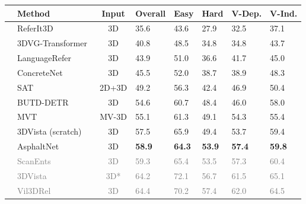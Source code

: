 \documentclass[10pt,twocolumn,letterpaper]{article}
\begin{document}
\begin{table}[t]
\centering
  \tabcolsep=0.26cm
\begin{tabular}{|c|l|c|x{1.2cm}|x{1.3cm} x{1.1cm} x{1.1cm} x{1.3cm}|}
 & Method & Input &  \textbf{Overall} & Easy & Hard & V-Dep. & V-Ind. \\
\hline
{} & ReferIt3D~\cite{achlioptas2020referit_3d} & 3D & 35.6 & 43.6 & 27.9 & 32.5 & 37.1 \\
& 3DVG-Transformer~\cite{zhao2021_3DVG_Transformer} & 3D&  40.8 & 48.5 & 34.8 & 34.8 & 43.7 \\
& LanguageRefer~\cite{roh2022languagerefer}  & 3D &  43.9 & 51.0 & 36.6 & 41.7 & 45.0 \\
& ConcreteNet~\cite{unal2023ways} & 3D & 45.5 & 52.0 & 38.7 & 38.9 & 48.3 \\
& SAT~\cite{yang2021sat} & 2D+3D&  49.2 & 56.3 & 42.4 & 46.9 & 50.4 \\
& BUTD-DETR~\cite{jain2022bottom}  & 3D&  54.6 & 60.7 & 48.4 & 46.0 & 58.0 \\
& MVT~\cite{huang2022multiview}  & MV-3D & 55.1 & 61.3 & 49.1 & 54.3 & 55.4 \\
  & 3DVista (scratch) & 3D & 57.5 & 65.9&  49.4 & 53.7 & 59.4 \\

& AsphaltNet  & 3D & \textbf{58.9} & \textbf{64.3} & \textbf{53.9} & \textbf{57.4} & \textbf{59.8} \\
& \textcolor{gray}{ ScanEnts~\cite{abdelreheem2024scanents3d}} & \textcolor{gray}{3D} & \textcolor{gray}{59.3} & \textcolor{gray}{65.4} & \textcolor{gray}{53.5} & \textcolor{gray}{57.3} & \textcolor{gray}{60.4} \\
  & \textcolor{gray}{3DVista~\cite{3dvista}} & \textcolor{gray}{3D*} &  \textcolor{gray}{64.2} & \textcolor{gray}{72.1} & \textcolor{gray}{56.7} & \textcolor{gray}{61.5} & \textcolor{gray}{65.1} \\
& \textcolor{gray}{Vil3DRel~\cite{chen2022language}} & \textcolor{gray}{3D} & \textcolor{gray}{64.4} & \textcolor{gray}{70.2} & \textcolor{gray}{57.4} & \textcolor{gray}{62.0} & \textcolor{gray}{64.5} \\


\end{tabular}
\end{table}
\end{document}

